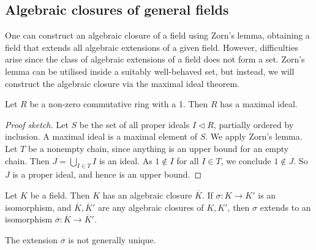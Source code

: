\subsection{Algebraic closures of general fields}
One can construct an algebraic closure of a field using Zorn's lemma, obtaining a field that extends all algebraic extensions of a given field.
However, difficulties arise since the class of algebraic extensions of a field does not form a set.
Zorn's lemma can be utilised inside a suitably well-behaved set, but instead, we will construct the algebraic closure via the maximal ideal theorem.
\begin{theorem}
	Let \( R \) be a non-zero commutative ring with a 1.
	Then \( R \) has a maximal ideal.
\end{theorem}
\begin{proof}[Proof sketch]
	Let \( S \) be the set of all proper ideals \( I \triangleleft R \), partially ordered by inclusion.
	A maximal ideal is a maximal element of \( S \).
	We apply Zorn's lemma.
	Let \( T \) be a nonempty chain, since anything is an upper bound for an empty chain.
	Then \( J = \bigcup_{I \in T} I \) is an ideal.
	As \( 1 \not\in I \) for all \( I \in T \), we conclude \( 1 \not\in J \).
	So \( J \) is a proper ideal, and hence is an upper bound.
\end{proof}
\begin{theorem}
	Let \( K \) be a field.
	Then \( K \) has an algebraic closure \( \overline K \).
	If \( \sigma \colon K \to K' \) is an isomorphism, and \( \overline K, \overline K' \) are any algebraic closures of \( K, K' \), then \( \sigma \) extends to an isomorphism \( \overline \sigma \colon \overline K \to \overline K' \).
\end{theorem}
\begin{remark}
	The extension \( \overline \sigma \) is not generally unique.
\end{remark}
